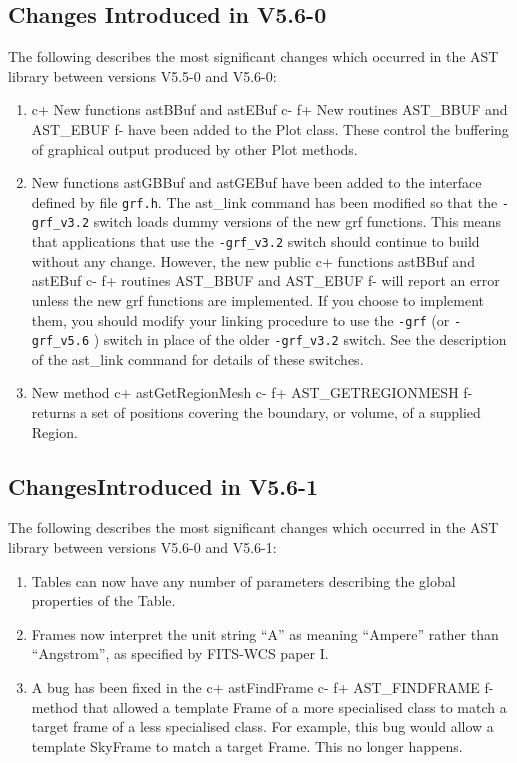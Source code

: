 \documentclass[twoside,11pt]{article}
\begin{document}
\subsection{Changes Introduced in V5.6-0}

The following describes the most significant changes which
occurred in the AST library between versions V5.5-0 and V5.6-0:

\begin{enumerate}

\item
c+
New functions astBBuf and astEBuf
c-
f+
New routines AST\_BBUF and AST\_EBUF
f-
have been added to the Plot class. These control the buffering of graphical
output produced by other Plot methods.

\item New functions astGBBuf and astGEBuf have been added to the interface
defined by file \verb+grf.h+. The ast\_link command has been modified so
that the \verb+-grf_v3.2+ switch loads dummy versions of the new grf
functions. This means that applications that use the  \verb+-grf_v3.2+
switch should continue to build without any change. However, the new public
c+
functions astBBuf and astEBuf
c-
f+
routines AST\_BBUF and AST\_EBUF
f-
will report an error unless the new grf functions are implemented. If you
choose to implement them, you should modify your linking procedure to
use the \verb+-grf+ (or  \verb+-grf_v5.6+ ) switch in place of the older
\verb+-grf_v3.2+ switch. See the description of the ast\_link command for
details of these switches.

\item New method
c+
astGetRegionMesh
c-
f+
AST\_GETREGIONMESH
f-
returns a set of positions covering the boundary, or volume, of a supplied
Region.

\end{enumerate}


\subsection{ChangesIntroduced in V5.6-1}

The following describes the most significant changes which
occurred in the AST library between versions V5.6-0 and V5.6-1:

\begin{enumerate}

\item Tables can now have any number of parameters describing the global
properties of the Table.

\item Frames now interpret the unit string ``A'' as meaning ``Ampere''
rather than ``Angstrom'', as specified by FITS-WCS paper I.

\item A bug has been fixed in the
c+
astFindFrame
c-
f+
AST\_FINDFRAME
f-
method that allowed a template Frame of a more specialised class to match
a target frame of a less specialised class. For example, this bug would
allow a template SkyFrame to match a target Frame. This no longer
happens.

\end{enumerate}
\end{document}
